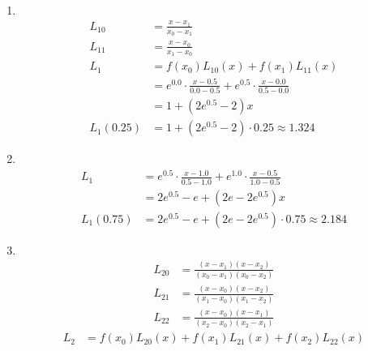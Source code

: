 \documentclass[lang = zh]{iwork}
\begin{document}
\begin{sol} ~
  \begin{enumerate}
    \item ~ \vspace{-\baselineskip}
          \begin{align*}
            L_{10}    & = \frac{x - x_1}{x_0 - x_1}                                                         \\
            L_{11}    & = \frac{x - x_0}{x_1 - x_0}                                                         \\
            L_1       & = f(x_0) L_{10}(x) + f(x_1) L_{11}(x)                                               \\
                      & = e^{0.0} \cdot \frac{x - 0.5}{0.0 - 0.5} + e^{0.5} \cdot \frac{x - 0.0}{0.5 - 0.0} \\
                      & = 1 + (2 e^{0.5} - 2) x                                                             \\
            L_1(0.25) & = 1 + (2 e^{0.5} - 2) \cdot 0.25 \approx \num{1.324}
          \end{align*}
    \item ~ \vspace{-\baselineskip}
          \begin{align*}
            L_1       & = e^{0.5} \cdot \frac{x - 1.0}{0.5 - 1.0} + e^{1.0} \cdot \frac{x - 0.5}{1.0 - 0.5} \\
                      & = 2 e^{0.5} - e + (2 e - 2 e^{0.5}) x                                               \\
            L_1(0.75) & = 2 e^{0.5} - e + (2 e - 2 e^{0.5}) \cdot 0.75 \approx \num{2.184}
          \end{align*}
    \item ~ \vspace{-\baselineskip}
          \begin{align*}
            L_{20} & = \frac{(x - x_1)(x - x_2)}{(x_0 - x_1)(x_0 - x_2)} \\
            L_{21} & = \frac{(x - x_0)(x - x_2)}{(x_1 - x_0)(x_1 - x_2)} \\
            L_{22} & = \frac{(x - x_0)(x - x_1)}{(x_2 - x_0)(x_2 - x_1)}
          \end{align*}
          \begin{equation*}
            \begin{split}
              L_2 & = f(x_0) L_{20}(x) + f(x_1) L_{21}(x) + f(x_2) L_{22}(x)                                                                                      \\

\end{split}
\end{equation*}
\end{enumerate}
\end{sol}
\end{document}
